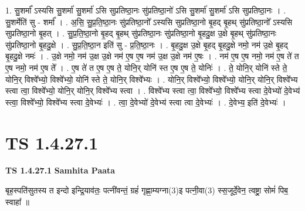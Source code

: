 \documentclass[17pt]{extarticle}
\begin{document}
1. सु॒शर्मा᳚ ऽस्यसि सु॒शर्मा॑ सु॒शर्मा॑ ऽसि सुप्रतिष्ठा॒नः सु॑प्रतिष्ठा॒नो॑ ऽसि सु॒शर्मा॑ सु॒शर्मा॑ ऽसि सुप्रतिष्ठा॒नः । . सु॒शर्मेति॑ सु - शर्मा᳚ । . अ॒सि॒ सु॒प्र॒ति॒ष्ठा॒नः सु॑प्रतिष्ठा॒नो᳚ ऽस्यसि सुप्रतिष्ठा॒नो बृ॒हद् बृ॒हथ् सु॑प्रतिष्ठा॒नो᳚ ऽस्यसि सुप्रतिष्ठा॒नो बृ॒हत् । . सु॒प्र॒ति॒ष्ठा॒नो बृ॒हद् बृ॒हथ् सु॑प्रतिष्ठा॒नः सु॑प्रतिष्ठा॒नो बृ॒हदु॒क्ष उ॒क्षे बृ॒हथ् सु॑प्रतिष्ठा॒नः सु॑प्रतिष्ठा॒नो बृ॒हदु॒क्षे । . सु॒प्र॒ति॒ष्ठा॒न इति॑ सु - प्र॒ति॒ष्ठा॒नः । . बृ॒हदु॒क्ष उ॒क्षे बृ॒हद् बृ॒हदु॒क्षे नमो॒ नम॑ उ॒क्षे बृ॒हद् बृ॒हदु॒क्षे नमः॑ । . उ॒क्षे नमो॒ नम॑ उ॒क्ष उ॒क्षे नम॑ ए॒ष ए॒ष नम॑ उ॒क्ष उ॒क्षे नम॑ ए॒षः । . नम॑ ए॒ष ए॒ष नमो॒ नम॑ ए॒ष ते॑ त ए॒ष नमो॒ नम॑ ए॒ष ते᳚ । . ए॒ष ते॑ त ए॒ष ए॒ष ते॒ योनि॒र् योनि॑ स्त ए॒ष ए॒ष ते॒ योनिः॑ । . ते॒ योनि॒र् योनि॑ स्ते ते॒ योनि॒र् विश्वे᳚भ्यो॒ विश्वे᳚भ्यो॒ योनि॑ स्ते ते॒ योनि॒र् विश्वे᳚भ्यः । . योनि॒र् विश्वे᳚भ्यो॒ विश्वे᳚भ्यो॒ योनि॒र् योनि॒र् विश्वे᳚भ्य स्त्वा त्वा॒ विश्वे᳚भ्यो॒ योनि॒र् योनि॒र् विश्वे᳚भ्य स्त्वा । . विश्वे᳚भ्य स्त्वा त्वा॒ विश्वे᳚भ्यो॒ विश्वे᳚भ्य स्त्वा दे॒वेभ्यो॑ दे॒वेभ्य॑ स्त्वा॒ विश्वे᳚भ्यो॒ विश्वे᳚भ्य स्त्वा दे॒वेभ्यः॑ । . त्वा॒ दे॒वेभ्यो॑ दे॒वेभ्य॑ स्त्वा त्वा दे॒वेभ्यः॑ । . दे॒वेभ्य॒ इति॑ दे॒वेभ्यः॑ । \newline
\pagebreak
{}

\section{ TS 1.4.27.1 }

\textbf{TS 1.4.27.1 } \newline
\textbf{Samhita Paata} \newline

बृह॒स्पति॑सुतस्य त इन्दो इन्द्रि॒याव॑तः॒ पत्नी॑वन्तं॒ ग्रहं॑ गृह्णा॒म्यग्ना(3)इ पत्नी॒वा(3) स्स॒जूर्दे॒वेन॒ त्वष्ट्रा॒ सोमं॑ पिब॒ स्वाहा᳚ ॥ \newline
\end{document}
